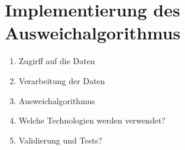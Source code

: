 \section{Implementierung des Ausweichalgorithmus}

\begin{enumerate}
    \item Zugirff auf die Daten
    \item Verarbeitung der Daten
    \item Ausweichalgorithmus
    \item Welche Technologien werden verwendet?
    \item Validierung und Tests?
\end{enumerate}

\newpage
